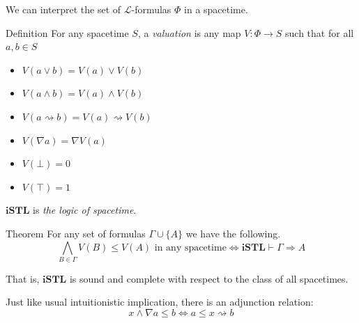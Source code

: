 \documentclass{beamer}
\begin{document}
\begin{frame}{\subSemantics}
	We can interpret the set of $\mathcal{L}$-formulas $\Phi$ in a spacetime.

	\begin{block}{Definition}
		For any spacetime $S$, a \emph{valuation} is any map $V : \Phi \to S$ such that for all $a, b \in S$
		\begin{itemize}
			\item $V(a \vee b) = V(a) \vee V(b)$
			\item $V(a \wedge b) = V(a) \wedge V(b)$
			\item $V(a \rightsquigarrow b) = V(a) \rightsquigarrow V(b)$
			\item $V(\nabla a) = \nabla V(a)$
			\item $V(\bot) = 0$
			\item $V(\top) = 1$
		\end{itemize}
	\end{block}
\end{frame}

\begin{frame}{\subSemantics}
	$\mathbf{iSTL}$ is \emph{the logic of spacetime}.

	\begin{block}{Theorem}
		For any set of formulas $\Gamma \cup \{ A \}$ we have the following.
		\[ \bigwedge_{B \in \Gamma} V(B) \leq V(A) \text{ in any spacetime} \iff \mathbf{iSTL} \vdash \Gamma \Rightarrow A \]

		That is, $\mathbf{iSTL}$ is sound and complete with respect to the class of all spacetimes. \cite{amir}
		\vspace{1ex}
	\end{block}

	Just like usual intuitionistic implication, there is an adjunction relation:
	\[ x \wedge \nabla a \leq b \iff a \leq x \rightsquigarrow b \]
\end{frame}
\end{document}
